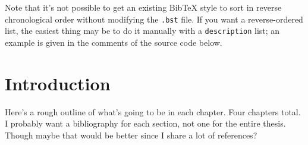 \documentclass[12pt]{caltech_thesis}
\begin{document}
Note that it's not possible to get an existing BibTeX style to sort in reverse chronological order without modifying the \texttt{.bst} file. If you want a reverse-ordered list, the easiest thing may be to do it manually with a \texttt{description} list; an example is given in the comments of the source code below.




\tableofcontents
\listoffigures
\listoftables
\printnomenclature

\mainmatter

\chapter{Introduction}

Here's a rough outline of what's going to be in each chapter. Four chapters
total. I probably want a bibliography for each section, not one for the entire
thesis. Though maybe that would be better since I share a lot of references?
\end{document}

